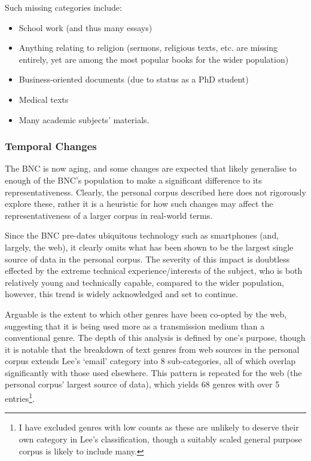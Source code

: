 Such missing categories include:
\begin{itemize}
    \item School work (and thus many essays)
    \item Anything relating to religion (sermons, religious texts, etc. are missing entirely, yet are among the most popular books for the wider population)
    \item Business-oriented documents (due to status as a PhD student)
    \item Medical texts
    \item Many academic subjects' materials.
\end{itemize}


%






\subsubsection{Temporal Changes}
The BNC is now aging, and some changes are expected that likely generalise to enough of the BNC's population to make a significant difference to its representativeness.  Clearly, the personal corpus described here does not rigorously explore these, rather it is a heuristic for how such changes may affect the representativeness of a larger corpus in real-world terms.


Since the BNC pre-dates ubiquitous technology such as smartphones (and, largely, the web), it clearly omits what has been shown to be the largest single source of data in the personal corpus.  The severity of this impact is doubtless effected by the extreme technical experience/interests of the subject, who is both relatively young and technically capable, compared to the wider population, however, this trend is widely acknowledged and set to continue.

Arguable is the extent to which other genres have been co-opted by the web, suggesting that it is being used more as a transmission medium than a conventional genre.  The depth of this analysis is defined by one's purpose, though it is notable that the breakdown of text genres from web sources in the personal corpus extends Lee's `email' category into 8 sub-categories, all of which overlap significantly with those used elsewhere.  This pattern is repeated for the web (the personal corpus' largest source of data), which yields 68 genres with over 5 entries\footnote{I have excluded genres with low counts as these are unlikely to deserve their own category in Lee's classification, though a suitably scaled general purpose corpus is likely to include many.}.

